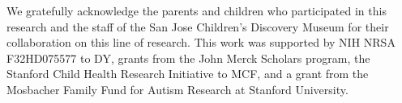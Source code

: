 \documentclass{pnastwo}
\begin{document}
\begin{article}
\begin{materials}
\end{materials}

\begin{acknowledgments}
We gratefully acknowledge the parents and children who participated in this research and the staff of the San Jose Children's Discovery Museum for their collaboration on this line of research. This work was supported by NIH NRSA F32HD075577 to DY, grants from the John Merck Scholars program, the Stanford Child Health Research Initiative to MCF, and a grant from the Mosbacher Family Fund for Autism Research at Stanford University.
\end{acknowledgments}


\linespread{.8}\selectfont


\end{article}
\end{document}
